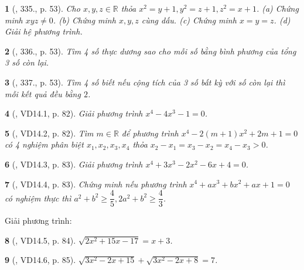 \documentclass{article}
\newtheorem{baitoan}{}
\begin{document}
\begin{baitoan}[\cite{Binh_Toan_9_tap_2}, 335., p. 53]
	Cho $x,y,z\in\mathbb{R}$ thỏa $x^2 = y + 1,y^2 = z + 1,z^2 = x + 1$. (a) Chứng minh $xyz\ne0$. (b) Chứng minh $x,y,z$ cùng dấu. (c) Chứng minh $x = y = z$. (d) Giải hệ phương trình.
\end{baitoan}

\begin{baitoan}[\cite{Binh_Toan_9_tap_2}, 336., p. 53]
	Tìm 4 số thực dương sao cho mỗi số bằng bình phương của tổng 3 số còn lại.
\end{baitoan}

\begin{baitoan}[\cite{Binh_Toan_9_tap_2}, 337., p. 53]
	Tìm 4 số biết nếu cộng tích của 3 số bất kỳ với số còn lại thì mỗi kết quả đều bằng $2$.
\end{baitoan}

\begin{baitoan}[\cite{TLCT_THCS_Toan_9_dai_so}, VD14.1, p. 82]
	Giải phương trình $x^4 - 4x^3 - 1 = 0$.
\end{baitoan}

\begin{baitoan}[\cite{TLCT_THCS_Toan_9_dai_so}, VD14.2, p. 82]
	Tìm $m\in\mathbb{R}$ để phương trình $x^4 - 2(m + 1)x^2 + 2m + 1 = 0$ có 4 nghiệm phân biệt $x_1,x_2,x_3,x_4$ thỏa $x_2 - x_1 = x_3 - x_2 = x_4 - x_3 > 0$.
\end{baitoan}

\begin{baitoan}[\cite{TLCT_THCS_Toan_9_dai_so}, VD14.3, p. 83]
	Giải phương trình $x^4 + 3x^3 - 2x^2 - 6x + 4 = 0$.
\end{baitoan}

\begin{baitoan}[\cite{TLCT_THCS_Toan_9_dai_so}, VD14.4, p. 83]
	Chứng minh nếu phương trình $x^4 + ax^3 + bx^2 + ax + 1 = 0$ có nghiệm thực thì $a^2 + b^2\ge\dfrac{4}{5},2a^2 + b^2\ge\dfrac{4}{3}$.
\end{baitoan}
Giải phương trình:

\begin{baitoan}[\cite{TLCT_THCS_Toan_9_dai_so}, VD14.5, p. 84]
	$\sqrt{2x^2 + 15x - 17} = x + 3$.
\end{baitoan}

\begin{baitoan}[\cite{TLCT_THCS_Toan_9_dai_so}, VD14.6, p. 85]
	$\sqrt{3x^2 - 2x + 15} + \sqrt{3x^2 - 2x + 8} = 7$.
\end{baitoan}
\end{document}
